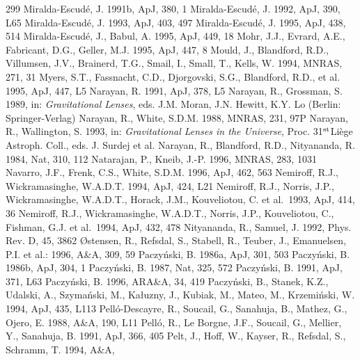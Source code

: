 \documentclass[a4paper,10pt]{article} %
\begin{document}
\begin{thebibliography}{299}
  Miralda-Escud\'e, J. 1991b, ApJ, 380, 1
  Miralda-Escud\'e, J. 1992, ApJ, 390, L65
  Miralda-Escud\'e, J. 1993, ApJ, 403, 497
  Miralda-Escud\'e, J. 1995, ApJ, 438, 514
  Miralda-Escud\'e, J., Babul, A. 1995, ApJ, 449, 18
  Mohr, J.J., Evrard, A.E., Fabricant, D.G., Geller, M.J. 1995, ApJ,
  447, 8
  Mould, J., Blandford, R.D., Villumsen, J.V., Brainerd, T.G., Smail,
  I., Small, T., Kells, W. 1994, MNRAS, 271, 31
  Myers, S.T., Fassnacht, C.D., Djorgovski, S.G., Blandford, R.D., et
  al. 1995, ApJ, 447, L5
  Narayan, R. 1991, ApJ, 378, L5
  Narayan, R., Grossman, S. 1989, in: {\em Gravitational Lenses\/},
  eds. J.M. Moran, J.N. Hewitt, K.Y. Lo (Berlin: Springer-Verlag)
  Narayan, R., White, S.D.M. 1988, MNRAS, 231, 97P
  Narayan, R., Wallington, S. 1993, in: {\em Gravitational Lenses in
  the Universe\/}, Proc. 31$^{\rm st}$Li\`ege Astroph. Coll.,
  eds. J. Surdej et al.
  Narayan, R., Blandford, R.D., Nityananda, R. 1984, Nat, 310, 112
  Natarajan, P., Kneib, J.-P. 1996, MNRAS, 283, 1031
  Navarro, J.F., Frenk, C.S., White, S.D.M. 1996, ApJ, 462, 563
  Nemiroff, R.J., Wickramasinghe, W.A.D.T. 1994, ApJ, 424, L21
  Nemiroff, R.J., Norris, J.P., Wickramasinghe, W.A.D.T., Horack,
  J.M., Kouveliotou, C. et al.\ 1993, ApJ, 414, 36
  Nemiroff, R.J., Wickramasinghe, W.A.D.T., Norris, J.P., Kouveliotou,
  C., Fishman, G.J. et al.\ 1994, ApJ, 432, 478
  Nityananda, R., Samuel, J. 1992, Phys. Rev. D, 45, 3862
  {\O}stensen, R., Refsdal, S., Stabell, R., Teuber, J., Emanuelsen,
  P.I. et al.: 1996, A\&A, 309, 59
  Paczy\'nski, B. 1986a, ApJ, 301, 503
  Paczy\'nski, B. 1986b, ApJ, 304, 1
  Paczy\'nski, B. 1987, Nat, 325, 572
  Paczy\'nski, B. 1991, ApJ, 371, L63
  Paczy\'nski, B. 1996, ARA\&A, 34, 419
  Paczy\'nski, B., Stanek, K.Z., Udalski, A., Szyma\'nski, M.,
  Ka{\l}uzny, J., Kubiak, M., Mateo, M., Krzemi\'nski, W. 1994, ApJ,
  435, L113
  Pell\'o-Descayre, R., Soucail, G., Sanahuja, B., Mathez, G., Ojero,
  E. 1988, A\&A, 190, L11
  Pell\'o, R., Le Borgne, J.F., Soucail, G., Mellier, Y., Sanahuja,
  B. 1991, ApJ, 366, 405
  Pelt, J., Hoff, W., Kayser, R., Refsdal, S., Schramm, T. 1994, A\&A,

\end{thebibliography}
\end{document}

